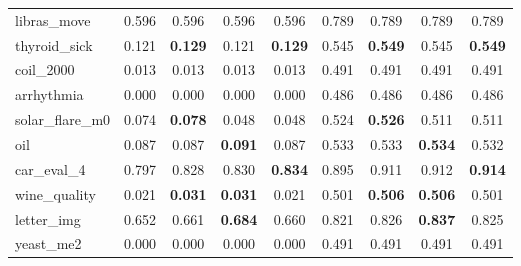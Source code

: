 \begin{figure}[ht]
\begin{tabular}{p{22mm}|*4{p{14mm}}|*4{p{14mm}}}
        libras\_move&\multicolumn{1}{c}{0.596}&\multicolumn{1}{c}{0.596}&\multicolumn{1}{c}{0.596}&\multicolumn{1}{c|}{0.596}&\multicolumn{1}{c}{0.789}&\multicolumn{1}{c}{0.789}&\multicolumn{1}{c}{0.789}&\multicolumn{1}{c}{0.789}\\
        thyroid\_sick&\multicolumn{1}{c}{0.121}&\multicolumn{1}{c}{\textbf{0.129}}&\multicolumn{1}{c}{0.121}&\multicolumn{1}{c|}{\textbf{0.129}}&\multicolumn{1}{c}{0.545}&\multicolumn{1}{c}{\textbf{0.549}}&\multicolumn{1}{c}{0.545}&\multicolumn{1}{c}{\textbf{0.549}}\\
        coil\_2000&\multicolumn{1}{c}{0.013}&\multicolumn{1}{c}{0.013}&\multicolumn{1}{c}{0.013}&\multicolumn{1}{c|}{0.013}&\multicolumn{1}{c}{0.491}&\multicolumn{1}{c}{0.491}&\multicolumn{1}{c}{0.491}&\multicolumn{1}{c}{0.491}\\
        arrhythmia&\multicolumn{1}{c}{0.000}&\multicolumn{1}{c}{0.000}&\multicolumn{1}{c}{0.000}&\multicolumn{1}{c|}{0.000}&\multicolumn{1}{c}{0.486}&\multicolumn{1}{c}{0.486}&\multicolumn{1}{c}{0.486}&\multicolumn{1}{c}{0.486}\\
        solar\_flare\_m0&\multicolumn{1}{c}{0.074}&\multicolumn{1}{c}{\textbf{0.078}}&\multicolumn{1}{c}{0.048}&\multicolumn{1}{c|}{0.048}&\multicolumn{1}{c}{0.524}&\multicolumn{1}{c}{\textbf{0.526}}&\multicolumn{1}{c}{0.511}&\multicolumn{1}{c}{0.511}\\
        oil&\multicolumn{1}{c}{0.087}&\multicolumn{1}{c}{0.087}&\multicolumn{1}{c}{\textbf{0.091}}&\multicolumn{1}{c|}{0.087}&\multicolumn{1}{c}{0.533}&\multicolumn{1}{c}{0.533}&\multicolumn{1}{c}{\textbf{0.534}}&\multicolumn{1}{c}{0.532}\\
        car\_eval\_4&\multicolumn{1}{c}{0.797}&\multicolumn{1}{c}{0.828}&\multicolumn{1}{c}{0.830}&\multicolumn{1}{c|}{\textbf{0.834}}&\multicolumn{1}{c}{0.895}&\multicolumn{1}{c}{0.911}&\multicolumn{1}{c}{0.912}&\multicolumn{1}{c}{\textbf{0.914}}\\
        wine\_quality&\multicolumn{1}{c}{0.021}&\multicolumn{1}{c}{\textbf{0.031}}&\multicolumn{1}{c}{\textbf{0.031}}&\multicolumn{1}{c|}{0.021}&\multicolumn{1}{c}{0.501}&\multicolumn{1}{c}{\textbf{0.506}}&\multicolumn{1}{c}{\textbf{0.506}}&\multicolumn{1}{c}{0.501}\\
        letter\_img&\multicolumn{1}{c}{0.652}&\multicolumn{1}{c}{0.661}&\multicolumn{1}{c}{\textbf{0.684}}&\multicolumn{1}{c|}{0.660}&\multicolumn{1}{c}{0.821}&\multicolumn{1}{c}{0.826}&\multicolumn{1}{c}{\textbf{0.837}}&\multicolumn{1}{c}{0.825}\\
        yeast\_me2&\multicolumn{1}{c}{0.000}&\multicolumn{1}{c}{0.000}&\multicolumn{1}{c}{0.000}&\multicolumn{1}{c|}{0.000}&\multicolumn{1}{c}{0.491}&\multicolumn{1}{c}{0.491}&\multicolumn{1}{c}{0.491}&\multicolumn{1}{c}{0.491}\\

\end{tabular}
\end{figure}
